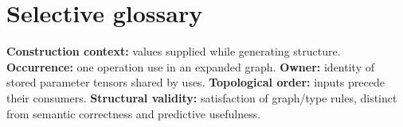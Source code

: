 \section*{Selective glossary}
\textbf{Construction context:} values supplied while generating structure.
\textbf{Occurrence:} one operation use in an expanded graph.
\textbf{Owner:} identity of stored parameter tensors shared by uses.
\textbf{Topological order:} inputs precede their consumers.
\textbf{Structural validity:} satisfaction of graph/type rules, distinct
from semantic correctness and predictive usefulness.
